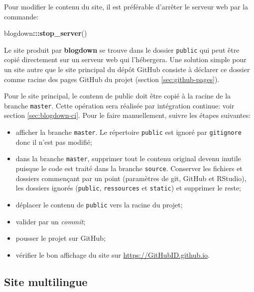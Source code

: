\documentclass[
  12pt,
  french,
  a4paper,
  extrafontsizes,onecolumn,openright
  ]{memoir}
\newenvironment{Shaded}{\begin{snugshade}}{\end{snugshade}}
\newcommand{\KeywordTok}[1]{\textcolor[rgb]{0.13,0.29,0.53}{\textbf{#1}}}
\newcommand{\NormalTok}[1]{#1}
\newcommand{\OperatorTok}[1]{\textcolor[rgb]{0.81,0.36,0.00}{\textbf{#1}}}
\providecommand{\tightlist}{%
  \setlength{\itemsep}{0pt}\setlength{\parskip}{0pt}}
\begin{document}
Pour modifier le contenu du site, il est préférable d'arrêter le serveur web par la commande:

\scriptsize

\begin{Shaded}
\begin{Highlighting}[]
\NormalTok{blogdown}\OperatorTok{:::}\KeywordTok{stop_server}\NormalTok{()}
\end{Highlighting}
\end{Shaded}

\normalsize

Le site produit par \textbf{blogdown} se trouve dans le dossier \texttt{public} qui peut être copié directement sur un serveur web qui l'hébergera.
Une solution simple pour un site autre que le site principal du dépôt GitHub consiste à déclarer ce dossier comme racine des pages GitHub du projet
(section \ref{sec:github-pages}).

Pour le site principal, le contenu de public doit être copié à la racine de la branche \texttt{master}.
Cette opération sera réalisée par intégration continue: voir section \ref{sec:blogdown-ci}.
Pour le faire manuellement, suivre les étapes suivantes:

\begin{itemize}
\tightlist
\item
  afficher la branche \texttt{master}. Le répertoire \texttt{public} est ignoré par \texttt{gitignore} donc il n'est pas modifié;
\item
  dans la branche \texttt{master}, supprimer tout le contenu original devenu inutile puisque le code est traité dans la branche \texttt{source}. Conserver les fichiers et dossiers commençant par un point (paramètres de git, GitHub et RStudio), les dossiers ignorés (\texttt{public}, \texttt{ressources} et \texttt{static}) et supprimer le reste;
\item
  déplacer le contenu de \texttt{public} vers la racine du projet;
\item
  valider par un \emph{commit};
\item
  pousser le projet sur GitHub;
\item
  vérifier le bon affichage du site sur \url{https://GitHubID.github.io}.
\end{itemize}

\hypertarget{site-multilingue}{%
\subsection{Site multilingue}\label{site-multilingue}}
\end{document}
